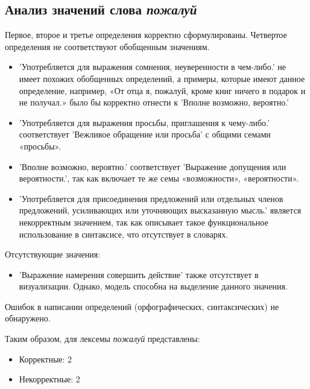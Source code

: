 \subsection*{Анализ значений слова \textit{пожалуй}}

Первое, второе и третье определения корректно сформулированы.
Четвертое определения не соответствуют обобщенным значениям.

\begin{itemize}
    \item ’Употребляется для выражения сомнения, неуверенности в чем-либо.’
не имеет похожих обобщенных определений, а примеры, которые имеют данное определение,
например, «От отца я, пожалуй, кроме книг ничего в подарок и не получал.»
было бы корректно отнести к ’Вполне возможно, вероятно.’

    \item ’Употребляется для выражения просьбы, приглашения к чему-либо.’ соответствует
’Вежливое обращение или просьба’ с общими семами «просьбы».

    \item ’Вполне возможно, вероятно.’ соответствует
’Выражение допущения или вероятности.’, так как включает те же семы «возможности», «вероятности».
\end{itemize}

\begin{itemize}
    \item ’Употребляется для присоединения предложений или отдельных членов предложений,
усиливающих или уточняющих высказанную мысль.’ является некорректным значением,
так как описывает такое функциональное использование в синтаксисе, что отсутствует в словарях.
\end{itemize}

Отсутствующие значения:
\begin{itemize}
    \item ’Выражение намерения совершить действие’ также отсутствует в визуализации.
Однако, модель способна на выделение данного значения. %
\end{itemize}

Ошибок в написании определений (орфографических, синтаксических) не обнаружено.

Таким образом, для лексемы \textit{пожалуй} представлены:

\begin{itemize}
    \item Корректные: 2
    \item Некорректные: 2
\end{itemize}

